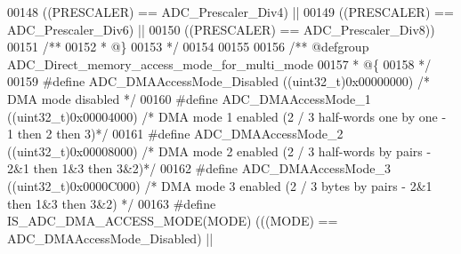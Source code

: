\begin{DoxyCode}
00148                                      \textcolor{preprocessor}{(}\textcolor{preprocessor}{(}\textcolor{preprocessor}{PRESCALER}\textcolor{preprocessor}{)} \textcolor{preprocessor}{==} ADC_Prescaler_Div4\textcolor{preprocessor}{)} \textcolor{preprocessor}{||}
00149                                      \textcolor{preprocessor}{(}\textcolor{preprocessor}{(}\textcolor{preprocessor}{PRESCALER}\textcolor{preprocessor}{)} \textcolor{preprocessor}{==} ADC_Prescaler_Div6\textcolor{preprocessor}{)} \textcolor{preprocessor}{||}
00150                                      \textcolor{preprocessor}{(}\textcolor{preprocessor}{(}\textcolor{preprocessor}{PRESCALER}\textcolor{preprocessor}{)} \textcolor{preprocessor}{==} ADC_Prescaler_Div8\textcolor{preprocessor}{)}\textcolor{preprocessor}{)}
00151 \textcolor{comment}{/**}
00152 \textcolor{comment}{  * @\}}
00153 \textcolor{comment}{  */}
00154 
00155 
00156 \textcolor{comment}{/** @defgroup ADC\_Direct\_memory\_access\_mode\_for\_multi\_mode }
00157 \textcolor{comment}{  * @\{}
00158 \textcolor{comment}{  */}
00159 \textcolor{preprocessor}{#}\textcolor{preprocessor}{define} \textcolor{preprocessor}{ADC\_DMAAccessMode\_Disabled}      \textcolor{preprocessor}{(}\textcolor{preprocessor}{(}\textcolor{preprocessor}{uint32\_t}\textcolor{preprocessor}{)}0x00000000\textcolor{preprocessor}{)}     \textcolor{comment}{/* DMA mode disabled */}
00160 \textcolor{preprocessor}{#}\textcolor{preprocessor}{define} \textcolor{preprocessor}{ADC\_DMAAccessMode\_1}             \textcolor{preprocessor}{(}\textcolor{preprocessor}{(}\textcolor{preprocessor}{uint32\_t}\textcolor{preprocessor}{)}0x00004000\textcolor{preprocessor}{)}     \textcolor{comment}{/* DMA mode 1 enabled (2 / 3
       half-words one by one - 1 then 2 then 3)*/}
00161 \textcolor{preprocessor}{#}\textcolor{preprocessor}{define} \textcolor{preprocessor}{ADC\_DMAAccessMode\_2}             \textcolor{preprocessor}{(}\textcolor{preprocessor}{(}\textcolor{preprocessor}{uint32\_t}\textcolor{preprocessor}{)}0x00008000\textcolor{preprocessor}{)}     \textcolor{comment}{/* DMA mode 2 enabled (2 / 3
       half-words by pairs - 2&1 then 1&3 then 3&2)*/}
00162 \textcolor{preprocessor}{#}\textcolor{preprocessor}{define} \textcolor{preprocessor}{ADC\_DMAAccessMode\_3}             \textcolor{preprocessor}{(}\textcolor{preprocessor}{(}\textcolor{preprocessor}{uint32\_t}\textcolor{preprocessor}{)}0x0000C000\textcolor{preprocessor}{)}     \textcolor{comment}{/* DMA mode 3 enabled (2 / 3 bytes
       by pairs - 2&1 then 1&3 then 3&2) */}
00163 \textcolor{preprocessor}{#}\textcolor{preprocessor}{define} \textcolor{preprocessor}{IS\_ADC\_DMA\_ACCESS\_MODE}\textcolor{preprocessor}{(}\textcolor{preprocessor}{MODE}\textcolor{preprocessor}{)} \textcolor{preprocessor}{(}\textcolor{preprocessor}{(}\textcolor{preprocessor}{(}\textcolor{preprocessor}{MODE}\textcolor{preprocessor}{)} \textcolor{preprocessor}{==} ADC_DMAAccessMode_Disabled\textcolor{preprocessor}{)} \textcolor{preprocessor}{||}

\end{DoxyCode}
